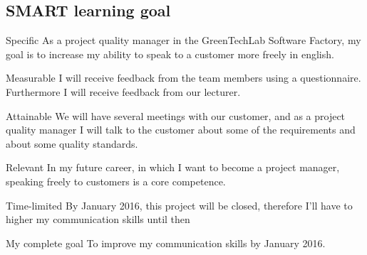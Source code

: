 \documentclass[12pt]{article}
\begin{document}
	\subsection{SMART learning goal}
	\begin{SMART}
	    \item[Specific] As a project quality manager in the GreenTechLab Software Factory, my goal is to increase my ability to speak to a customer more freely in english.
	    \item[Measurable] I will receive feedback from the team members using a questionnaire. Furthermore I will receive feedback from our lecturer.
	    \item[Attainable] We will have several meetings with our customer, and as a project quality manager I will talk to the customer about some of the requirements and about some quality standards.
	    \item[Relevant] In my future career, in which I want to become a project manager, speaking freely to customers is a core competence.
	    \item[Time-limited] By January 2016, this project will be closed, therefore I’ll have to higher my communication skills until then
	    \item[My complete goal] To improve my communication skills by January 2016.
	\end{SMART}
	
\end{document}
